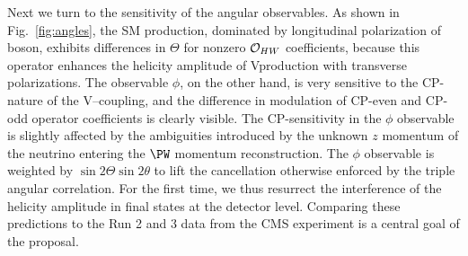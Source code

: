 \documentclass[a4paper,11pt]{article}
\renewcommand{\PV}{{{{V}}}\xspace}
\begin{document}
Next we turn to the sensitivity of the angular observables. As shown in Fig.~\ref{fig:angles}, 
the SM production, dominated by longitudinal polarization of \PW boson, exhibits differences in $\Theta$ for nonzero ${\cal O}_{HW}$  coefficients, because this operator  enhances the helicity amplitude of \PV\PH production with transverse polarizations.%
The observable $\phi$, on the other hand, is very sensitive to the CP-nature of the \PV--\PH coupling, and the difference in modulation of CP-even and CP-odd operator coefficients is clearly visible.  
The CP-sensitivity in the $\phi$ observable is slightly affected by the ambiguities introduced by the unknown $z$ momentum of the neutrino entering the $\PW$ momentum reconstruction. %
The $\phi$ observable is weighted by $\sin2\Theta\sin2\theta$ to lift the cancellation otherwise enforced by the triple angular correlation. 
For the first time, we thus resurrect the interference of the helicity amplitude in \PH final states at the detector level. 
Comparing these predictions to the Run 2 and 3 data from the CMS experiment is a central goal of the proposal.
\end{document}
